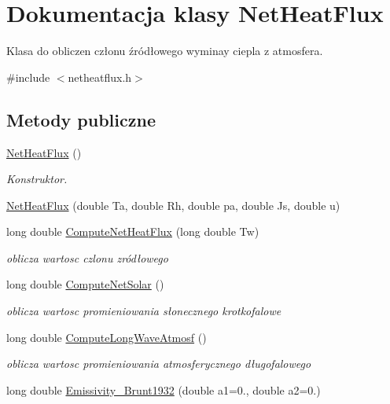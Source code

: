 \hypertarget{class_net_heat_flux}{}\section{Dokumentacja klasy Net\+Heat\+Flux}
\label{class_net_heat_flux}


Klasa do obliczen członu źródłowego wyminay ciepla z atmosfera.  




{\ttfamily \#include $<$netheatflux.\+h$>$}

\subsection*{Metody publiczne}
\begin{DoxyCompactItemize}
\item 
\hyperlink{class_net_heat_flux_a6e4c7b7a65cc582fe7f812b10d8dd0ae}{Net\+Heat\+Flux} ()
\begin{DoxyCompactList}\small\item\em Konstruktor. \end{DoxyCompactList}\item 
\hyperlink{class_net_heat_flux_a49a9703237a48c6851464376b0892246}{Net\+Heat\+Flux} (double Ta, double Rh, double pa, double Js, double u)
\item 
long double \hyperlink{class_net_heat_flux_a31570d0c05e45b2a01a05b3976617ac4}{Compute\+Net\+Heat\+Flux} (long double Tw)
\begin{DoxyCompactList}\small\item\em oblicza wartosc czlonu zródłowego \end{DoxyCompactList}\item 
long double \hyperlink{class_net_heat_flux_a5bf457660c754e02562840cc90cf00ac}{Compute\+Net\+Solar} ()
\begin{DoxyCompactList}\small\item\em oblicza wartosc promieniowania słonecznego krotkofalowe \end{DoxyCompactList}\item 
long double \hyperlink{class_net_heat_flux_a8c35767d0fdf37fd6216e0c2f1e71cc2}{Compute\+Long\+Wave\+Atmosf} ()
\begin{DoxyCompactList}\small\item\em oblicza wartosc promieniowania atmosferycznego długofalowego \end{DoxyCompactList}\item 
long double \hyperlink{class_net_heat_flux_a87b1a80ed14554fcaf903a3383f25a77}{Emissivity\+\_\+\+Brunt1932} (double a1=0., double a2=0.)

\end{DoxyCompactItemize}

